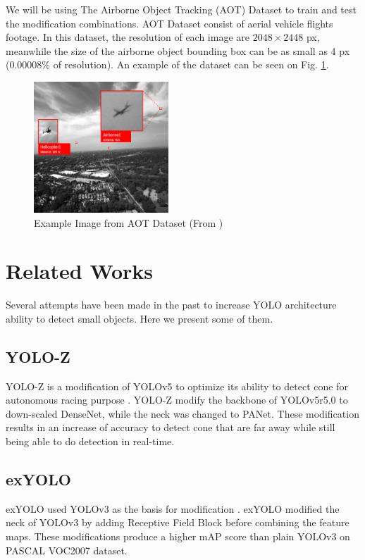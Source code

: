 \documentclass[conference]{IEEEtran}
\begin{document}
We will be using The Airborne Object Tracking (AOT) Dataset \cite{aot_dataset} to train
and test the modification combinations. AOT Dataset consist of aerial vehicle flights
footage. In this dataset, the resolution of each image are $2048\times2448$ px, meanwhile
the size of the airborne object bounding box can be as small as 4 px (0.00008\% of resolution).
An example of the dataset can be seen on Fig. \ref{fig:airborne-example}.

\begin{figure}[t]
\centerline{\includegraphics[width=0.45\textwidth]{../book/figures/dataset-example-labeled.png}}
\caption{Example Image from AOT Dataset (From \cite{aot_dataset})}
\label{fig:airborne-example}
\end{figure}

\section{Related Works}
Several attempts have been made in the past to increase YOLO architecture ability
to detect small objects. Here we present some of them.
\subsection{YOLO-Z}
YOLO-Z is a modification of YOLOv5 to optimize its ability to detect
cone for autonomous racing purpose \cite{yoloz}.
YOLO-Z modify the backbone of YOLOv5r5.0 to down-scaled DenseNet, while
the neck was changed to PANet.
These modification results in an increase of accuracy to detect cone
that are far away while still being able to do detection in real-time.
\subsection{exYOLO}
exYOLO used YOLOv3 as the basis for modification \cite{exyolo}. 
exYOLO modified
the neck of YOLOv3 by adding Receptive Field Block before combining the feature maps.
These modifications produce a higher mAP score than plain YOLOv3 on
PASCAL VOC2007 dataset.
\end{document}
